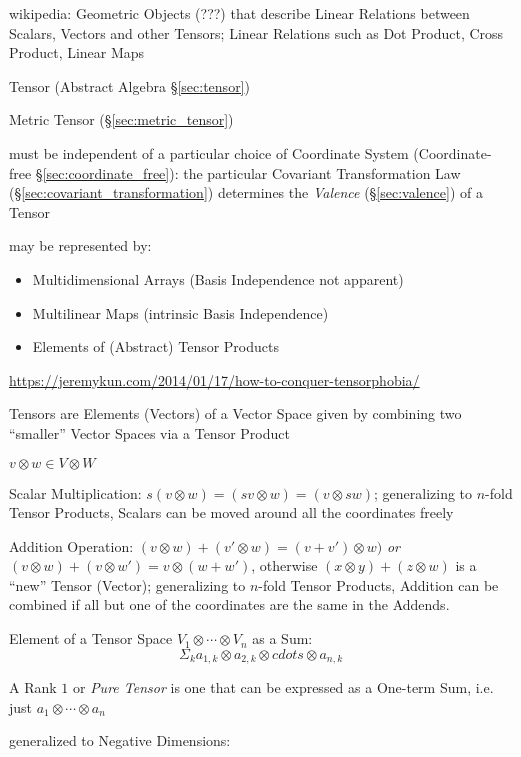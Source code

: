 wikipedia: Geometric Objects (???) that describe Linear Relations
between Scalars, Vectors and other Tensors; Linear Relations such as
Dot Product, Cross Product, Linear Maps


\fist Tensor (Abstract Algebra \S\ref{sec:tensor})

\fist Metric Tensor (\S\ref{sec:metric_tensor})

must be independent of a particular choice of Coordinate System
(Coordinate-free \S\ref{sec:coordinate_free}): the particular Covariant
Transformation Law (\S\ref{sec:covariant_transformation}) determines
the \emph{Valence} (\S\ref{sec:valence}) of a Tensor

may be represented by:
\begin{itemize}
  \item Multidimensional Arrays (Basis Independence not apparent)
  \item Multilinear Maps (intrinsic Basis Independence)
  \item Elements of (Abstract) Tensor Products
\end{itemize}

\fist
\url{https://jeremykun.com/2014/01/17/how-to-conquer-tensorphobia/}

Tensors are Elements (Vectors) of a Vector Space given by
combining two ``smaller'' Vector Spaces via a Tensor Product

$v \otimes w \in V \otimes W$

Scalar Multiplication: $s(v \otimes w) = (sv \otimes w) = (v \otimes
sw)$; generalizing to  $n$-fold Tensor Products, Scalars can be moved
around all the coordinates freely

Addition Operation: $(v \otimes w) + (v' \otimes w) = (v + v') \otimes
w)$ \emph{or} $(v \otimes w) + (v \otimes w') = v \otimes (w + w')$,
otherwise $(x \otimes y) + (z \otimes w)$ is a ``new'' Tensor
(Vector); generalizing to $n$-fold Tensor Products, Addition can be
combined if all but one of the coordinates are the same in the
Addends.

Element of a Tensor Space $V_1 \otimes \cdots \otimes V_n$ as a Sum:
\[
  \Sigma_k a_{1,k} \otimes a_{2,k} \otimes cdots \otimes a_{n,k}
\]

A Rank $1$ or \emph{Pure Tensor} is one that can be expressed as a
One-term Sum, i.e. just $a_1 \otimes \cdots \otimes a_n$


\asterism

generalized to Negative Dimensions:

